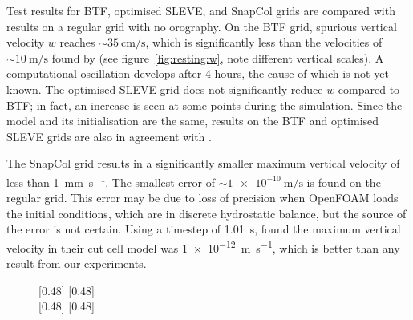 Test results for BTF, optimised SLEVE, and SnapCol grids are compared with results on a regular grid with no orography.  On the BTF grid, spurious vertical velocity $w$ reaches $\sim \SI{35}{\centi\meter\per\second}$, which is significantly less than the velocities of $\sim \SI{10}{\meter\per\second}$ found by \textcite{klemp2011} (see figure~\ref{fig:resting:w}, note different vertical scales).  A computational oscillation develops after 4 hours, the cause of which is not yet known.  The optimised SLEVE grid does not significantly reduce $w$ compared to BTF; in fact, an increase is seen at some points during the simulation.  Since the model and its initialisation are the same, results on the BTF and optimised SLEVE grids are also in agreement with \textcite{weller-shahrokhi2014}.

The SnapCol grid results in a significantly smaller maximum vertical velocity of less than \SI{1}{\milli\meter\per\second}.  The smallest error of $\sim \SI{1e-10}{\meter\per\second}$ is found on the regular grid.  This error may be due to loss of precision when OpenFOAM loads the initial conditions, which are in discrete hydrostatic balance, but the source of the error is not certain.  Using a timestep of \SI{1.01}{\second}, \textcite{good2013} found the maximum vertical velocity in their cut cell model was \SI{1e-12}{\meter\per\second}, which is better than any result from our experiments.

\begin{figure}
	\captionsetup[subfigure]{position=b}
	\centering
	[0.48\textwidth]{}
	\hfill
	[0.48\textwidth]{\TODO{}}
	\\
	[0.48\textwidth]{\TODO{}}
	\hfill
	[0.48\textwidth]{\TODO{}}
	\caption{}
	\label{fig:resting:energy}
\end{figure}





